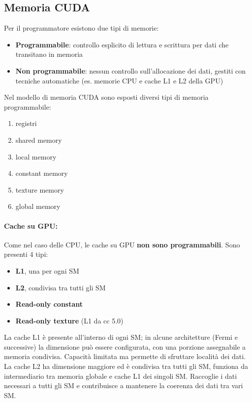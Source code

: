 \subsection{Memoria CUDA}

Per il programmatore esistono due tipi di memorie: 
\begin{itemize}
	\item \textbf{Programmabile}: controllo esplicito di lettura e scrittura per dati che transitano in memoria
	\item \textbf{Non programmabile}: nessun controllo sull'allocazione dei dati, gestiti con tecniche automatiche (es. memorie CPU e cache L1 e L2 della GPU)
\end{itemize}

Nel modello di memoria CUDA sono esposti diversi tipi di memoria programmabile: 
\begin{enumerate}
	\item registri
	\item shared memory
	\item local memory
	\item constant memory
	\item texture memory
	\item global memory
\end{enumerate}

\paragraph{Cache su GPU:} Come nel caso delle CPU, le cache su GPU \textbf{non sono programmabili}. Sono presenti 4 tipi:
\begin{itemize}
	\item \textbf{L1}, una per ogni SM
	\item \textbf{L2}, condivisa tra tutti gli SM
	\item \textbf{Read-only constant}
	\item \textbf{Read-only texture} (L1 da cc 5.0)
\end{itemize}

La cache L1 è presente all'interno di ogni SM; in alcune architetture (Fermi e successive) la dimensione può essere configurata, con una porzione assegnabile a memoria condivisa. Capacità limitata ma permette di sfruttare località dei dati.\\
La cache L2 ha dimensione maggiore ed è condivisa tra tutti gli SM, funziona da intermediario tra memoria globale e cache L1 dei singoli SM. Raccoglie i dati necessari a tutti gli SM e contribuisce a mantenere la coerenza dei dati tra vari SM.\\

